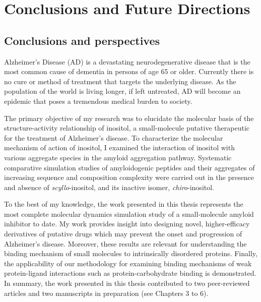 
\chapter{Conclusions and Future Directions}
\section{Conclusions and perspectives}
Alzheimer's Disease (AD) is a devastating neurodegenerative disease that is the most common cause of dementia in persons of age 65 or older. Currently there is no cure or method of treatment that targets the underlying disease.  As the population of the world is living longer, if left untreated, AD will become an epidemic that poses a tremendous medical burden to society. 

The primary objective of my research was to elucidate the molecular basis of the structure-activity relationship of inositol, a small-molecule putative therapeutic for the treatment of Alzheimer's disease.  To characterize the molecular mechanism of action of inositol, I examined the interaction of inositol with various aggregate species in the amyloid aggregation pathway. Systematic comparative simulation studies of amyloidogenic peptides and their aggregates of increasing sequence and composition complexity were carried out in the presence and absence of \emph{scyllo}-inositol, and its inactive isomer, \emph{chiro}-inositol.

To the best of my knowledge, the work presented in this thesis represents the most complete molecular dynamics simulation study of a small-molecule amyloid inhibitor to date. My work provides insight into designing novel, higher-efficacy derivatives of putative drugs which may prevent the onset and progression of Alzheimer's disease.  Moreover, these results are relevant for understanding the binding mechanism of small molecules to intrinsically disordered proteins. Finally, the applicability of our methodology for examining binding mechanisms of weak protein-ligand interactions such as protein-carbohydrate binding is demonstrated. In summary, the work presented in this thesis contributed to two peer-reviewed articles and two manuscripts in preparation (see Chapters 3 to 6).

